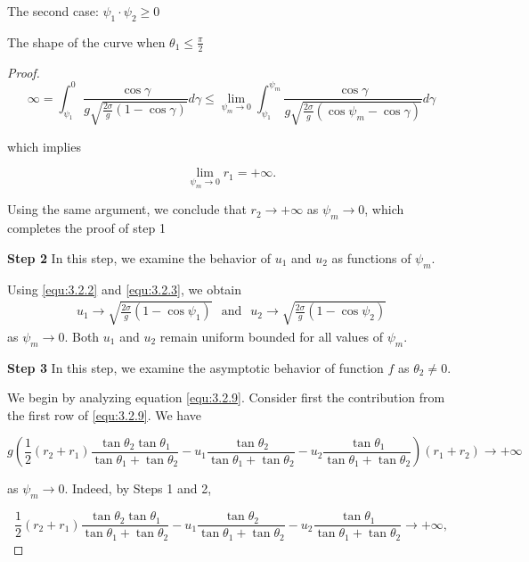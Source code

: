 \documentclass[letterpaper,reqno,10pt,twoside]{amsart}
\theoremstyle{definition}
\theoremstyle{remark}
\begin{document}
\begin{section}{The second case: $\psi_1\cdot \psi_2\geq 0$ }
\begin{subsection}{The shape of the curve when $\theta_1\leq \frac{\pi}{2}$}
\begin{proof}
            \begin{equation*}
                \infty=\int_{\psi_1}^{0}\frac{\cos\gamma}{g\sqrt{\frac{2\sigma}{g}(1-\cos\gamma)}}d\gamma\leq \lim_{\psi_{m}\rightarrow 0} \int_{\psi_1}^{\psi_m}\frac{\cos\gamma}{g\sqrt{\frac{2\sigma}{g}(\cos\psi_m-\cos\gamma)}}d\gamma
            \end{equation*}

           \noindent which implies

            \begin{equation*}
            \lim_{\psi_m\rightarrow 0} r_1=+\infty.
            \end{equation*}

            Using the same argument, we conclude that $r_2\rightarrow +\infty$ as $\psi_m\rightarrow 0$, which completes the proof of step 1

            \textbf{Step 2}  In this step, we examine the behavior of $u_1$ and $u_2$ as functions of $\psi_m$. 
            
            Using \eqref{equ:3.2.2} and \eqref{equ:3.2.3}, we obtain
            \begin{align}
                u_1\rightarrow \sqrt{\frac{2\sigma}{g}(1-\cos\psi_1)}~~\operatorname{and}~~u_2\rightarrow \sqrt{\frac{2\sigma}{g}(1-\cos\psi_2)}
            \end{align}
            as $\psi_m\rightarrow 0$. Both $u_1$ and $u_2$ remain uniform bounded for all values of $\psi_m$.

            \textbf{Step 3} In this step, we examine the asymptotic behavior of function $f$ as $\theta_2\neq 0$. 
            
            We begin by analyzing equation \eqref{equ:3.2.9}. Consider first the contribution from the first row of \eqref{equ:3.2.9}. We have

            \begin{equation*}
               g(\frac{1}{2}(r_2+r_1)\frac{\tan\theta_2\tan\theta_1}{\tan\theta_1+\tan\theta_2}-u_1\frac{\tan\theta_2}{\tan\theta_1+\tan\theta_2}-u_2\frac{\tan\theta_1}{\tan\theta_1+\tan\theta_2})(r_1+r_2)\rightarrow +\infty
            \end{equation*}

            \noindent as $\psi_m\rightarrow 0$. Indeed, by Steps 1 and 2,

            \begin{equation*}
                \frac{1}{2}(r_2+r_1)\frac{\tan\theta_2\tan\theta_1}{\tan\theta_1+\tan\theta_2}-u_1\frac{\tan\theta_2}{\tan\theta_1+\tan\theta_2}-u_2\frac{\tan\theta_1}{\tan\theta_1+\tan\theta_2}\rightarrow +\infty,
            \end{equation*}
            

\end{proof}
\end{subsection}
\end{section}
\end{document}
